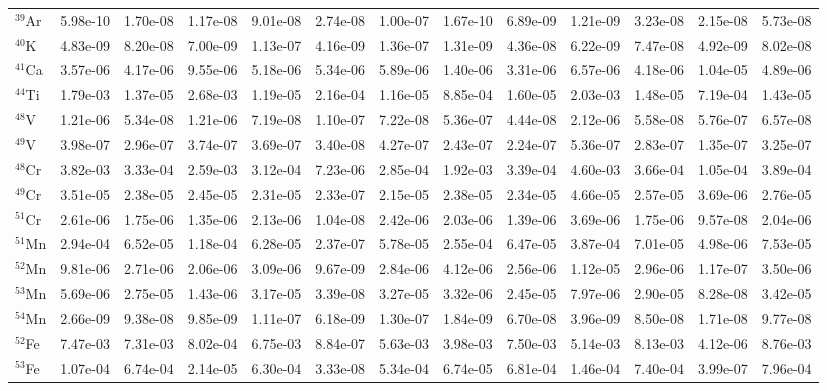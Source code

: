 \begin{landscape}
\begin{table}
\begin{tabular}{l|cc|cc|cc|cc|cc|cc}
$^{39}$Ar & 5.98e-10 & 1.70e-08 & 1.17e-08 & 9.01e-08 & 2.74e-08 & 1.00e-07 & 1.67e-10 & 6.89e-09 & 1.21e-09 & 3.23e-08 & 2.15e-08 & 5.73e-08\\
$^{40}$K & 4.83e-09 & 8.20e-08 & 7.00e-09 & 1.13e-07 & 4.16e-09 & 1.36e-07 & 1.31e-09 & 4.36e-08 & 6.22e-09 & 7.47e-08 & 4.92e-09 & 8.02e-08\\
$^{41}$Ca & 3.57e-06 & 4.17e-06 & 9.55e-06 & 5.18e-06 & 5.34e-06 & 5.89e-06 & 1.40e-06 & 3.31e-06 & 6.57e-06 & 4.18e-06 & 1.04e-05 & 4.89e-06\\
$^{44}$Ti & 1.79e-03 & 1.37e-05 & 2.68e-03 & 1.19e-05 & 2.16e-04 & 1.16e-05 & 8.85e-04 & 1.60e-05 & 2.03e-03 & 1.48e-05 & 7.19e-04 & 1.43e-05\\
$^{48}$V & 1.21e-06 & 5.34e-08 & 1.21e-06 & 7.19e-08 & 1.10e-07 & 7.22e-08 & 5.36e-07 & 4.44e-08 & 2.12e-06 & 5.58e-08 & 5.76e-07 & 6.57e-08\\
$^{49}$V & 3.98e-07 & 2.96e-07 & 3.74e-07 & 3.69e-07 & 3.40e-08 & 4.27e-07 & 2.43e-07 & 2.24e-07 & 5.36e-07 & 2.83e-07 & 1.35e-07 & 3.25e-07\\
$^{48}$Cr & 3.82e-03 & 3.33e-04 & 2.59e-03 & 3.12e-04 & 7.23e-06 & 2.85e-04 & 1.92e-03 & 3.39e-04 & 4.60e-03 & 3.66e-04 & 1.05e-04 & 3.89e-04\\
$^{49}$Cr & 3.51e-05 & 2.38e-05 & 2.45e-05 & 2.31e-05 & 2.33e-07 & 2.15e-05 & 2.38e-05 & 2.34e-05 & 4.66e-05 & 2.57e-05 & 3.69e-06 & 2.76e-05\\
$^{51}$Cr & 2.61e-06 & 1.75e-06 & 1.35e-06 & 2.13e-06 & 1.04e-08 & 2.42e-06 & 2.03e-06 & 1.39e-06 & 3.69e-06 & 1.75e-06 & 9.57e-08 & 2.04e-06\\
$^{51}$Mn & 2.94e-04 & 6.52e-05 & 1.18e-04 & 6.28e-05 & 2.37e-07 & 5.78e-05 & 2.55e-04 & 6.47e-05 & 3.87e-04 & 7.01e-05 & 4.98e-06 & 7.53e-05\\
$^{52}$Mn & 9.81e-06 & 2.71e-06 & 2.06e-06 & 3.09e-06 & 9.67e-09 & 2.84e-06 & 4.12e-06 & 2.56e-06 & 1.12e-05 & 2.96e-06 & 1.17e-07 & 3.50e-06\\
$^{53}$Mn & 5.69e-06 & 2.75e-05 & 1.43e-06 & 3.17e-05 & 3.39e-08 & 3.27e-05 & 3.32e-06 & 2.45e-05 & 7.97e-06 & 2.90e-05 & 8.28e-08 & 3.42e-05\\
$^{54}$Mn & 2.66e-09 & 9.38e-08 & 9.85e-09 & 1.11e-07 & 6.18e-09 & 1.30e-07 & 1.84e-09 & 6.70e-08 & 3.96e-09 & 8.50e-08 & 1.71e-08 & 9.77e-08\\
$^{52}$Fe & 7.47e-03 & 7.31e-03 & 8.02e-04 & 6.75e-03 & 8.84e-07 & 5.63e-03 & 3.98e-03 & 7.50e-03 & 5.14e-03 & 8.13e-03 & 4.12e-06 & 8.76e-03\\
$^{53}$Fe & 1.07e-04 & 6.74e-04 & 2.14e-05 & 6.30e-04 & 3.33e-08 & 5.34e-04 & 6.74e-05 & 6.81e-04 & 1.46e-04 & 7.40e-04 & 3.99e-07 & 7.96e-04\\

\end{tabular}
\end{table}
\end{landscape}
